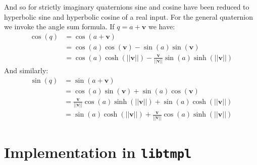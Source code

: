 \documentclass{article}
\theoremstyle{plain}
\theoremstyle{normal}
\begin{document}
            And so for strictly imaginary quaternions sine and cosine have been
            reduced to hyperbolic sine and hyperbolic cosine of a real input.
            For the general quaternion we invoke the angle sum formula. If
            $q=a+\mathbf{v}$ we have:
            \begin{subequations}
                \begin{align}
                    \cos(q)
                    &=\cos(a+\mathbf{v})\\
                    &=\cos(a)\cos(\mathbf{v})-\sin(a)\sin(\mathbf{v})\\
                    &=\cos(a)\cosh(||\mathbf{v}||)
                        -\frac{\mathbf{v}}{||\mathbf{v}||}
                        \sin(a)\sinh(||\mathbf{v}||)
                \end{align}
            \end{subequations}
            And similarly:
            \begin{subequations}
                \begin{align}
                    \sin(q)
                    &=\sin(a+\mathbf{v})\\
                    &=\cos(a)\sin(\mathbf{v})+\sin(a)\cos(\mathbf{v})\\
                    &=\frac{\mathbf{v}}{||\mathbf{v}||}
                        \cos(a)\sinh(||\mathbf{v}||)
                        +\sin(a)\cosh(||\mathbf{v}||)\\
                    &=\sin(a)\cosh(||\mathbf{v}||)+
                        \frac{\mathbf{v}}{||\mathbf{v}||}
                        \cos(a)\sinh(||\mathbf{v}||)
                \end{align}
            \end{subequations}
    \section{Implementation in \texttt{libtmpl}}
    \newpage
    
    
\end{document}
